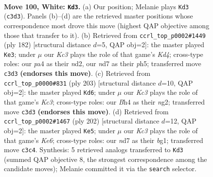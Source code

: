 \documentclass[11pt]{article}
\begin{document}
\clearpage

\begin{figure}[p]\centering
\begin{subfigure}{0.46\textwidth}\centering
\resizebox{\linewidth}{!}{%
\newchessgame
\chessboard[
  setfen={6k1/3n4/8/5P2/p6B/P1K4P/8/8 w - - 19 100},
  showmover=false,
  pgfstyle=straightmove, color=movearrow, markmove={c3-d3}
]}
\caption{}
\end{subfigure}\hfill
\begin{subfigure}{0.46\textwidth}\centering
\resizebox{\linewidth}{!}{%
\newchessgame
\chessboard[
  setfen={8/8/3k4/5B1p/3K1P1P/8/3n4/8 w - - 1 92},
  showmover=false,
  pgfstyle=straightmove, color=movearrow, markmove={d4-e3}
]}
\caption{}
\end{subfigure}
\\[4pt]
\begin{subfigure}{0.46\textwidth}\centering
\resizebox{\linewidth}{!}{%
\newchessgame
\chessboard[
  setfen={8/8/2k5/p7/P1K5/8/4p1N1/8 b - - 71 102},
  showmover=false,
  pgfstyle=straightmove, color=movearrow, markmove={c6-d6}
]}
\caption{}
\end{subfigure}\hfill
\begin{subfigure}{0.46\textwidth}\centering
\resizebox{\linewidth}{!}{%
\newchessgame
\chessboard[
  setfen={8/8/4K1k1/5p2/7B/5P1P/8/6b1 w - - 18 102},
  showmover=false,
  pgfstyle=straightmove, color=movearrow, markmove={e6-e5}
]}
\caption{}
\end{subfigure}
\caption{\textbf{Move 100, White: \texttt{Kd3}.} (a) Our position; Melanie plays \texttt{Kd3} (\texttt{c3d3}). Panels (b)--(d) are the retrieved master positions whose correspondence most drove this move (highest QAP objective among those that transfer to it). (b) Retrieved from \texttt{ccrl\_top\_p0002\#1449} (ply 182) [structural distance $d$=5, QAP obj=2]: the master played \texttt{Ke3}; under $\mu$ our \emph{Kc3} plays the role of that game's \emph{Kd4}; cross-type roles: our \emph{p}a4 as their \emph{n}d2, our \emph{n}d7 as their \emph{p}h5; transferred move \texttt{c3d3} \textbf{(endorses this move)}. (c) Retrieved from \texttt{ccrl\_top\_p0000\#831} (ply 203) [structural distance $d$=10, QAP obj=2]: the master played \texttt{Kd6}; under $\mu$ our \emph{Kc3} plays the role of that game's \emph{Kc3}; cross-type roles: our \emph{B}h4 as their \emph{n}g2; transferred move \texttt{c3d3} \textbf{(endorses this move)}. (d) Retrieved from \texttt{ccrl\_top\_p0002\#1467} (ply 202) [structural distance $d$=12, QAP obj=2]: the master played \texttt{Ke5}; under $\mu$ our \emph{Kc3} plays the role of that game's \emph{Ke6}; cross-type roles: our \emph{n}d7 as their \emph{b}g1; transferred move \texttt{c3c4}. Synthesis: 5 retrieved analogs transferred to \texttt{Kd3} (summed QAP objective 8, the strongest correspondence among the candidate moves); Melanie committed it via the \texttt{search} selector.}
\label{fig:thought-m198}
\end{figure}
\end{document}
